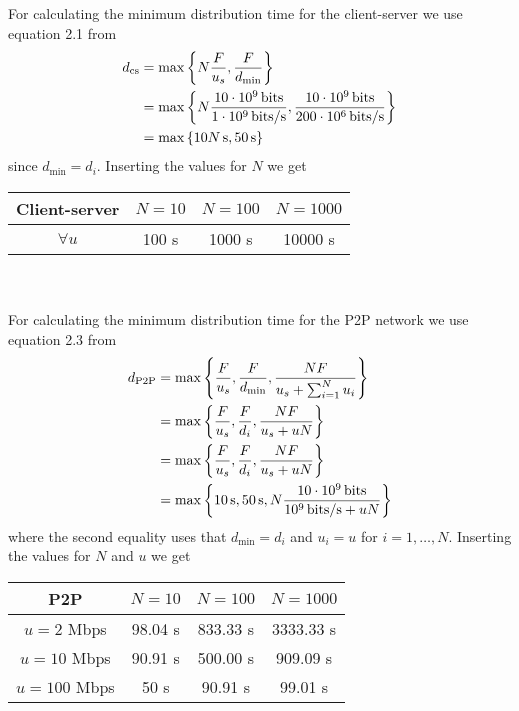 For calculating the minimum distribution time for the client-server we use equation 2.1 from \cite{kr}
\begin{equation*}
\begin{split}
    d_\text{cs} &= \max \left \{N \frac{F}{u_s}, \frac{F}{d_\text{min}}\right\} \\
    &= \max \left \{N\frac{10 \cdot 10^9 \, \text{bits}}{1 \cdot 10^9 \, \text{bits/s}}, \frac{10 \cdot 10^9 \, \text{bits}}{200 \cdot 10^6 \, \text{bits/s}}\right\} \\
    &= \max \left \{10N \, \text{s}, 50 \, \text{s}\right\} \\
\end{split}
\end{equation*}
since $d_\text{min} = d_i$. Inserting the values for $N$ we get \\
\begin{tabular}{|c|c|c|c|}
    \hline
    \textbf{Client-server} & $N = 10$ & $N = 100$ & $N = 1000$ \\
    \hline 
    $\forall u$ & 100 s & 1000 s & 10000 s \\
    \hline
\end{tabular} \\
\\
For calculating the minimum distribution time for the P2P network we use equation 2.3 from \cite{kr}
\begin{equation*}
\begin{split}
    d_\text{P2P} &= \max \left \{\frac{F}{u_s}, \frac{F}{d_\text{min}}, \frac{NF}{u_s + \sum_{i=1}^N u_i}\right\} \\
    &= \max \left \{\frac{F}{u_s}, \frac{F}{d_i}, \frac{NF}{u_s + uN}\right\} \\
    &= \max \left \{\frac{F}{u_s}, \frac{F}{d_i}, \frac{NF}{u_s + uN}\right\} \\
    &= \max \left \{10 \, \text{s}, 50 \, \text{s}, N\frac{10 \cdot 10^9 \, \text{bits}}{10^9 \, \text{bits/s} + uN}\right\} \\
\end{split}
\end{equation*}
where the second equality uses that $d_\text{min} = d_i$ and $u_i = u$ for $i = 1, \dots, N$.
Inserting the values for $N$ and $u$ we get \\
\begin{tabular}{|c|c|c|c|}
    \hline
    \textbf{P2P} & $N = 10$ & $N = 100$ & $N = 1000$ \\
    \hline 
    $u = 2$ Mbps & 98.04 s & 833.33 s & 3333.33 s \\
    \hline
    $u = 10$ Mbps & 90.91 s & 500.00 s & 909.09 s \\
    \hline
    $u = 100$ Mbps & 50 s & 90.91 s & 99.01 s \\
    \hline
\end{tabular}\\

